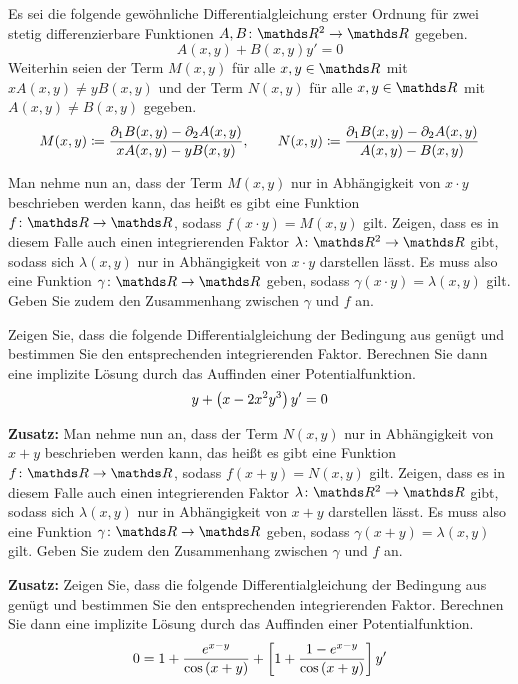 \begin{atiTask}[
  title = Spezielle integrierende Faktoren
  ]
  Es sei die folgende gewöhnliche Differentialgleichung erster Ordnung für zwei stetig differenzierbare Funktionen $\func{A,B}{\setR^2}{\setR}$ gegeben.
  \[
    A(x,y) + B(x,y)y' = 0
  \]
  Weiterhin seien der Term $M(x,y)$ für alle $x,y\in\setR$ mit $xA(x,y)\neq yB(x,y)$ und der Term $N(x,y)$ für alle $x,y\in\setR$ mit $A(x,y)\neq B(x,y)$ gegeben.
  \[
    M(x,y) \coloneqq \frac{\partial_1B(x,y) - \partial_2A(x,y)}{xA(x,y)-yB(x,y)},\qquad N(x,y) \coloneqq \frac{\partial_1B(x,y) - \partial_2A(x,y)}{A(x,y)-B(x,y)}
  \]
  \begin{atiSubtasks}
    \item{
      Man nehme nun an, dass der Term $M(x,y)$ nur in Abhängigkeit von $x\cdot y$ beschrieben werden kann, das heißt es gibt eine Funktion $\func{f}{\setR}{\setR}$, sodass $f(x\cdot y) = M(x,y)$ gilt.
      Zeigen, dass es in diesem Falle auch einen integrierenden Faktor $\func{\lambda}{\setR^2}{\setR}$ gibt, sodass sich $\lambda(x,y)$ nur in Abhängigkeit von $x\cdot y$ darstellen lässt.
      Es muss also eine Funktion $\func{\gamma}{\setR}{\setR}$ geben, sodass $\gamma(x\cdot y) = \lambda(x,y)$ gilt.
      Geben Sie zudem den Zusammenhang zwischen $\gamma$ und $f$ an.
    }
    \item{
      Zeigen Sie, dass die folgende Differentialgleichung der Bedingung aus  genügt und bestimmen Sie den entsprechenden integrierenden Faktor.
      Berechnen Sie dann eine implizite Lösung durch das Auffinden einer Potentialfunktion.
      \[
        y + \left( x - 2x^2y^3 \right)y' = 0
      \]
    }
    \item{
      \textbf{Zusatz:}
      Man nehme nun an, dass der Term $N(x,y)$ nur in Abhängigkeit von $x+ y$ beschrieben werden kann, das heißt es gibt eine Funktion $\func{f}{\setR}{\setR}$, sodass $f(x+ y) = N(x,y)$ gilt.
      Zeigen, dass es in diesem Falle auch einen integrierenden Faktor $\func{\lambda}{\setR^2}{\setR}$ gibt, sodass sich $\lambda(x,y)$ nur in Abhängigkeit von $x+ y$ darstellen lässt.
      Es muss also eine Funktion $\func{\gamma}{\setR}{\setR}$ geben, sodass $\gamma(x+ y) = \lambda(x,y)$ gilt.
      Geben Sie zudem den Zusammenhang zwischen $\gamma$ und $f$ an.
    }
    \item{
      \textbf{Zusatz:}
      Zeigen Sie, dass die folgende Differentialgleichung der Bedingung aus  genügt und bestimmen Sie den entsprechenden integrierenden Faktor.
      Berechnen Sie dann eine implizite Lösung durch das Auffinden einer Potentialfunktion.
      \[
        0 = 1 + \frac{e^{x-y}}{\cos\left( x+y \right)} + \left[ 1 + \frac{1-e^{x-y}}{\cos\left( x+y \right)} \right]y'
      \]
    }
  \end{atiSubtasks}
\end{atiTask}